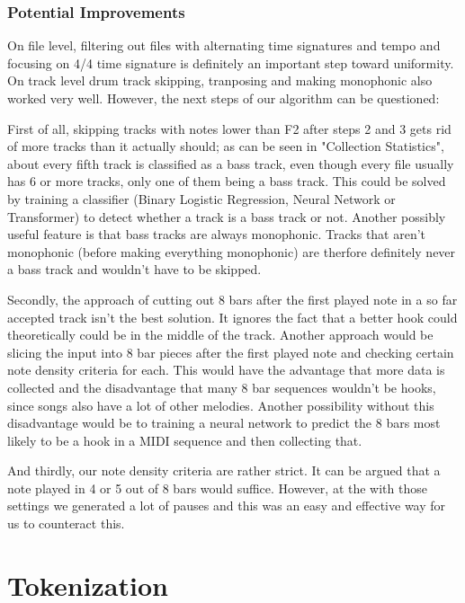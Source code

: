 \documentclass[a4paper,12pt]{extarticle}
\begin{document}
\subsubsection{Potential Improvements}

On file level, filtering out files with alternating time signatures and tempo and focusing on 4/4 time signature is definitely an important step toward uniformity.
On track level drum track skipping, tranposing and making monophonic also worked very well.
However, the next steps of our algorithm can be questioned: \newline

First of all, skipping tracks with notes lower than F2 after steps 2 and 3 gets rid
of more tracks than it actually should; as can be seen in "Collection Statistics",
about every fifth track is classified as a bass track, even though every file usually has 6 or more tracks, only one of them being a bass track.
This could be solved by training a classifier (Binary Logistic Regression, Neural Network or Transformer) to detect whether a track is a bass track or not.
Another possibly useful feature is that bass tracks are always monophonic. Tracks that aren't monophonic (before making everything monophonic) are therfore definitely never a bass track and wouldn't have to be skipped. \newline

Secondly, the approach of cutting out 8 bars after the first played note in a so far accepted track isn't the best solution.
It ignores the fact that a better hook could theoretically could be in the middle of the track. 
Another approach would be slicing the input into 8 bar pieces after the first played note and checking certain note density criteria for each.
This would have the advantage that more data is collected and the disadvantage that many 8 bar sequences wouldn't be hooks, since songs also have a lot of other melodies.
Another possibility without this disadvantage would be to training a neural network to predict the 8 bars most likely to be a hook in a MIDI sequence and then collecting that. \newline

And thirdly, our note density criteria are rather strict. It can be argued that a note played in 4 or 5 out of 8 bars would suffice.
However, at the with those settings we generated a lot of pauses and this was an easy and effective way for us to counteract this.


\section{Tokenization}
\end{document}
